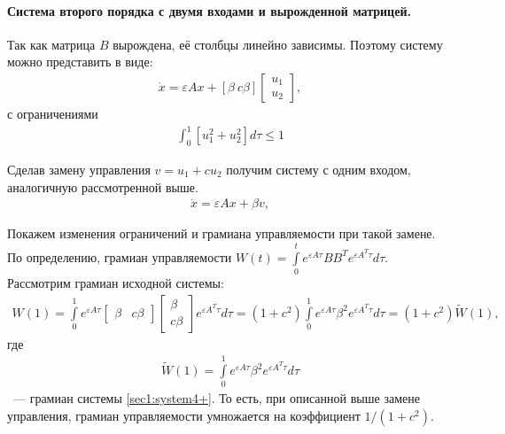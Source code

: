 \documentclass[../main.tex]{subfiles}
\begin{document}
\paragraph{Система второго порядка с двумя входами и вырожденной матрицей.}
Так как матрица $  B $ вырождена, её столбцы линейно зависимы.
Поэтому систему можно представить в виде:
\begin{gather}\label{sec1:system4}
     \dot{x} = \varepsilon A x + \left[ \beta \ c\beta \right]  {\left[ {\begin{array}{*{20}{c}}
                 {{u_1}}\\
                 {{u_2}}
         \end{array}} \right]}, 
\end{gather}
с ограничениями 
\begin{gather}\label{sec1:contrainsts1}
    \int_{0}^{1} \left[ u_1^2 + u_2^2 \right] d \tau \leq 1
\end{gather}
 
Сделав   замену  управления $ v = u_1 + c u_2 $ получим систему с одним входом, аналогичную рассмотренной выше.
\begin{gather}\label{sec1:system4+}
    \dot{x} = \varepsilon A x + \beta v, 
\end{gather}
 
Покажем изменения ограничений и грамиана управляемости при такой замене.
По определению, грамиан управляемости $ W(t) = \int \limits_0 ^ t e^{\varepsilon A\tau} B B^T e^{\varepsilon A^T\tau} d\tau  $.
Рассмотрим грамиан исходной системы: 
\begin{gather*}
    W(1) = \int \limits_0 ^ 1 e^{\varepsilon A\tau}  \left[ \begin{array}{cc}
         \beta & c \beta
     \end{array} \right] \left[ \begin{array}{c}
         \beta
         \\ c \beta 
     \end{array} \right] e^{\varepsilon A^T\tau} d\tau = (1 + c^2)  \int \limits_0 ^ 1 e^{\varepsilon A\tau} \beta^2 e^{\varepsilon A^T\tau} d\tau = (1 + c^2) \tilde{W}(1),
\end{gather*}
где 
\begin{gather*}
    \tilde{W}(1) = \int \limits_0 ^ 1 e^{\varepsilon A\tau} \beta^2 e^{\varepsilon A^T\tau} d\tau 
\end{gather*}
~--- грамиан системы \eqref{sec1:system4+}.
То есть, при описанной выше замене управления, грамиан управляемости умножается на коэффициент $ 1/(1 + c^2)$.
 
\end{document}
